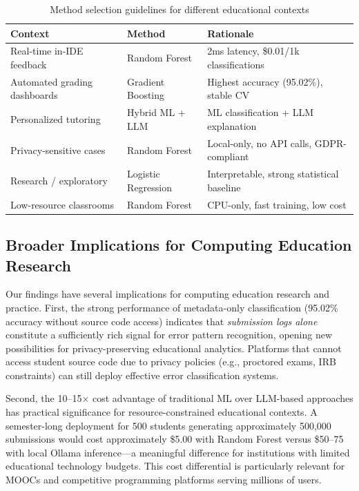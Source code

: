 \documentclass[acmsmall]{acmart}
\begin{document}
\begin{table}[htbp]
\centering
\caption{Method selection guidelines for different educational contexts}
\label{tab:guidelines}
\begin{tabular}{>{\raggedright\arraybackslash}p{2.8cm}
                >{\raggedright\arraybackslash}p{2.8cm}
                >{\raggedright\arraybackslash}p{6.4cm}}
\toprule
\textbf{Context} & \textbf{Method} & \textbf{Rationale} \\
\midrule
Real-time in-IDE feedback & Random Forest & 2ms latency, \$0.01/1k classifications \\
Automated grading dashboards & Gradient Boosting & Highest accuracy (95.02\%), stable CV \\
Personalized tutoring & Hybrid ML + LLM & ML classification + LLM explanation \\
Privacy-sensitive cases & Random Forest & Local-only, no API calls, GDPR-compliant \\
Research / exploratory & Logistic Regression & Interpretable, strong statistical baseline \\
Low-resource classrooms & Random Forest & CPU-only, fast training, low cost \\
\bottomrule
\end{tabular}
\end{table}

\subsection{Broader Implications for Computing Education Research}

Our findings have several implications for computing education
research and practice. First, the strong performance of metadata-only
classification (95.02\% accuracy without source code access) indicates that
\textit{submission logs alone} constitute a sufficiently rich signal for
error pattern recognition, opening new possibilities for privacy-preserving
educational analytics. Platforms that cannot access student source code
due to privacy policies (e.g., proctored exams, IRB constraints) can
still deploy effective error classification systems.

Second, the 10--15$\times$ cost advantage of traditional ML over LLM-based
approaches has practical significance for resource-constrained educational
contexts. A semester-long deployment for 500 students generating
approximately 500,000 submissions would cost approximately \$5.00 with Random
Forest versus \$50--75 with local Ollama inference---a meaningful difference
for institutions with limited educational technology budgets. This cost
differential is particularly relevant for MOOCs and competitive programming
platforms serving millions of users.
\end{document}
